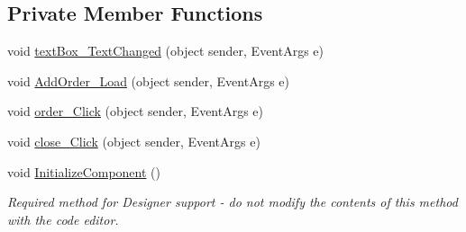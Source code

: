 \subsection*{Private Member Functions}
\begin{DoxyCompactItemize}
\item 
void \hyperlink{classproject__bot_1_1_add_order_a684cfffc3512c46fbbc2b14545fc8109}{text\+Box\+\_\+\+Text\+Changed} (object sender, Event\+Args e)
\item 
void \hyperlink{classproject__bot_1_1_add_order_a3d32201f08112f66db4b7276f14b083d}{Add\+Order\+\_\+\+Load} (object sender, Event\+Args e)
\item 
void \hyperlink{classproject__bot_1_1_add_order_a4632021406842a0822c18a161c117faa}{order\+\_\+\+Click} (object sender, Event\+Args e)
\item 
void \hyperlink{classproject__bot_1_1_add_order_a77fd72f115685ffcfde4a0c7cc5765ed}{close\+\_\+\+Click} (object sender, Event\+Args e)
\item 
void \hyperlink{classproject__bot_1_1_add_order_a7e3d4f70086017c86773a3ae31bfb61f}{Initialize\+Component} ()
\begin{DoxyCompactList}\small\item\em Required method for Designer support -\/ do not modify the contents of this method with the code editor. \end{DoxyCompactList}\end{DoxyCompactItemize}
